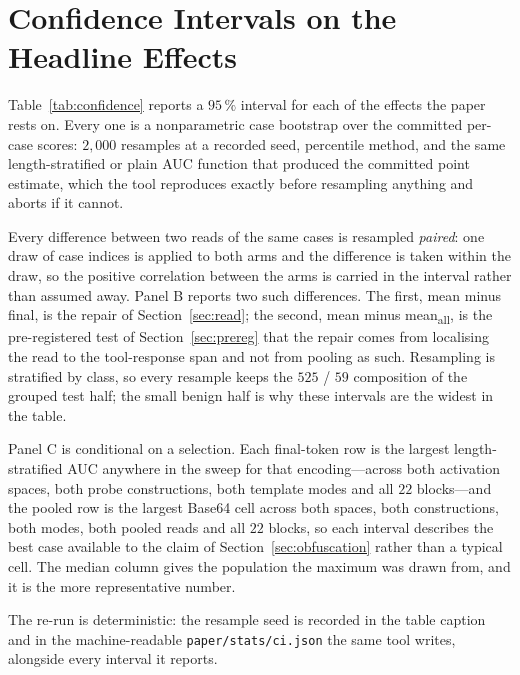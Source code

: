 \appendices
\section{Confidence Intervals on the Headline Effects}
\label{app:ci}

Table~\ref{tab:confidence} reports a $95\,\%$ interval for each of the effects the paper rests on. Every one is a
nonparametric case bootstrap over the committed per-case scores: $2{,}000$ resamples at a recorded seed, percentile
method, and the same length-stratified or plain AUC function that produced the committed point estimate, which the
tool reproduces exactly before resampling anything and aborts if it cannot.

Every difference between two reads of the same cases is resampled \emph{paired}: one draw of case indices is applied
to both arms and the difference is taken within the draw, so the positive correlation between the arms is carried in
the interval rather than assumed away. Panel B reports two such differences. The first, mean minus final, is the
repair of Section~\ref{sec:read}; the second, mean minus mean\textsubscript{all}, is the pre-registered test of
Section~\ref{sec:prereg} that the repair comes from localising the read to the tool-response span and not from
pooling as such. Resampling is stratified by class, so every resample keeps the $525$ / $59$ composition of the grouped
test half; the small benign half is why these intervals are the widest in the table.

Panel C is conditional on a selection. Each final-token row is the largest length-stratified AUC anywhere in the
sweep for that encoding---across both activation spaces, both probe constructions, both template modes and all $22$
blocks---and the pooled row is the largest Base64 cell across both spaces, both constructions, both modes, both pooled
reads and all $22$ blocks, so each interval describes the best case available to the claim of
Section~\ref{sec:obfuscation} rather than a typical cell. The median column gives the population the maximum was
drawn from, and it is the more representative number.



The re-run is deterministic: the resample seed is recorded in the table caption and in the machine-readable
\texttt{paper/stats/ci.json} the same tool writes, alongside every interval it reports.
